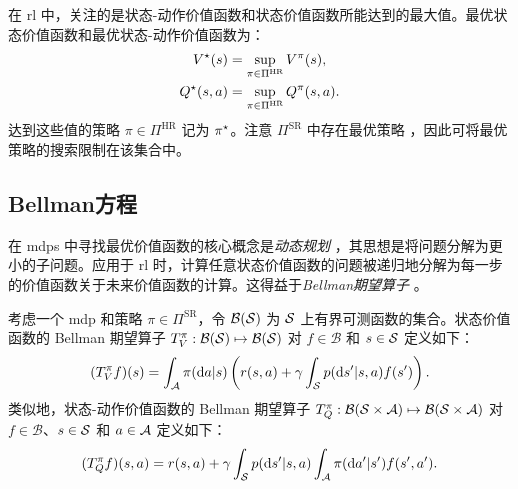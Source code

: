在 \gls{rl} 中，关注的是状态-动作价值函数和状态价值函数所能达到的最大值。最优状态价值函数和最优状态-动作价值函数为：
\begin{align*}
    V^{\star} (s)&= \sup_{\pi\in\Pi^{\text{HR}}}V^\pi(s),
    \\
    Q^{\star} (s,a)&= \sup_{\pi\in\Pi^{\text{HR}}}Q^\pi(s,a).
\end{align*}
达到这些值的策略 $\pi\in\Pi^{\text{HR}}$ 记为 $\pi^\star$。注意 $\Pi^{\text{SR}}$ 中存在最优策略 \cite[Theorem~6.2.10]{puterman1994markov}，因此可将最优策略的搜索限制在该集合中。

\subsection{Bellman方程}
在 \glspl{mdp} 中寻找最优价值函数的核心概念是\emph{动态规划} \cite{bellman1954theory}，其思想是将问题分解为更小的子问题。应用于 \gls{rl} 时，计算任意状态价值函数的问题被递归地分解为每一步的价值函数关于未来价值函数的计算。这得益于\emph{Bellman期望算子} \cite{bellman1966dynamic}。

\begin{defi}[Bellman期望算子]
    考虑一个 \gls{mdp} 和策略 $\pi\in\Pi^{\text{SR}}$，令 $\mathcal{B}(\mathcal{S})$ 为 $\mathcal{S}$ 上有界可测函数的集合。状态价值函数的 Bellman 期望算子 $T^{\pi}_V:\mathcal{B}(\mathcal{S})\mapsto\mathcal{B}(\mathcal{S})$ 对 $f\in\mathcal{B}$ 和 $s\in\mathcal{S}$ 定义如下：
    \begin{align}
    \label{eq:bellman_operator_V}
        (T^{\pi}_V f)(s) = \int_{\mathcal{A}}\pi(\mathrm{d} a\vert s)\left(r(s,a) + \gamma  \int_{\mathcal{S}}  p(\mathrm{d} s'\vert s,a) f(s')\right).
    \end{align}
    类似地，状态-动作价值函数的 Bellman 期望算子 $T^{\pi}_Q:\mathcal{B}(\mathcal{S}\times\mathcal{A})\mapsto\mathcal{B}(\mathcal{S}\times\mathcal{A})$ 对 $f\in\mathcal{B}$、$s\in\mathcal{S}$ 和 $a\in\mathcal{A}$ 定义如下：
    \begin{align}
    \label{eq:bellman_operator_Q}
        (T^{\pi}_Q f)(s,a) = r(s,a) + \gamma  \int_{\mathcal{S}}  p(\mathrm{d} s'\vert s,a)\int_{\mathcal{A}} \pi(\mathrm{d} a'\vert s')f(s',a').
    \end{align}
\end{defi}

